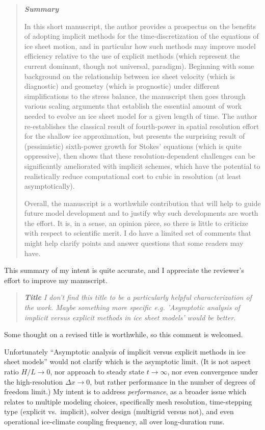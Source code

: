 \documentclass[letterpaper,final,12pt,reqno]{amsart}
\newenvironment{review}%
{\bigskip \par \begin{quote} \selectfont \sl}%
{\end{quote}}
\begin{document}
\begin{review}
\textbf{Summary}

In this short manuscript, the author provides a prospectus on the benefits of adopting implicit methods for the time-discretization of the equations of ice sheet motion, and in particular how such methods may improve model efficiency relative to the use of explicit methods (which represent the current dominant, though not universal, paradigm). Beginning with some background on the relationship between ice sheet velocity (which is diagnostic) and geometry (which is prognostic) under different simplifications to the stress balance, the manuscript then goes through various scaling arguments that establish the essential amount of work needed to evolve an ice sheet model for a given length of time. The author re-establishes the classical result of fourth-power in spatial resolution effort for the shallow ice approximation, but presents the surprising result of (pessimistic) sixth-power growth for Stokes’ equations (which is quite oppressive), then shows that these resolution-dependent challenges can be significantly ameliorated with implicit schemes, which have the potential to realistically reduce computational cost to cubic in resolution (at least asymptotically).

Overall, the manuscript is a worthwhile contribution that will help to guide future model development and to justify why such developments are worth the effort. It is, in a sense, an opinion piece, so there is little to criticize with respect to scientific merit. I do have a limited set of comments that might help clarify points and answer questions that some readers may have.
\end{review}

\noindent This summary of my intent is quite accurate, and I appreciate the reviewer's effort to improve my manuscript.

\begin{review}
\textbf{Title} I don't find this title to be a particularly helpful characterization of the work. Maybe something more specific e.g. 'Asymptotic analysis of implicit versus explicit methods in ice sheet models' would be better.
\end{review}

\noindent Some thought on a revised title is worthwhile, so this comment is welcomed.

Unfortunately ``Asymptotic analysis of implicit versus explicit methods in ice sheet models'' would not clarify which is the asymptotic limit.   (It is not aspect ratio $H/L \to 0$, nor approach to steady state $t\to \infty$, nor even convergence under the high-resolution $\Delta x \to 0$, but rather performance in the number of degrees of freedom limit.)  My intent is to address \emph{performance}, as a broader issue which relates to multiple modeling choices, specifically mesh resolution, time-stepping type (explicit vs.~implicit), solver design (multigrid versus not), and even operational ice-climate coupling frequency, all over long-duration runs.
\end{document}
